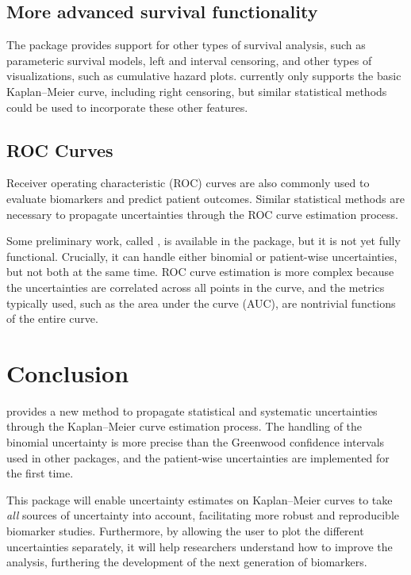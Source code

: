 \documentclass[article]{jss}
\newcommand{\KM}{Kaplan--Meier} %
\begin{document}
\subsection{More advanced survival functionality}

The  package provides support for other types of survival analysis, such as parameteric survival models, left and interval censoring, and other types of visualizations, such as cumulative hazard plots\@.   currently only supports the basic \KM{} curve, including right censoring, but similar statistical methods could be used to incorporate these other features.

\subsection{ROC Curves}

Receiver operating characteristic (ROC) curves are also commonly used to evaluate biomarkers and predict patient outcomes.  Similar statistical methods are necessary to propagate uncertainties through the ROC curve estimation process.

Some preliminary work, called , is available in the  package, but it is not yet fully functional.  Crucially, it can handle either binomial or patient-wise uncertainties, but not both at the same time.  ROC curve estimation is more complex because the uncertainties are correlated across all points in the curve, and the metrics typically used, such as the area under the curve (AUC), are nontrivial functions of the entire curve.

\section{Conclusion}

 provides a new method to propagate statistical and systematic uncertainties through the \KM{} curve estimation process.  The handling of the binomial uncertainty is more precise than the Greenwood confidence intervals used in other packages, and the patient-wise uncertainties are implemented for the first time.

This package will enable uncertainty estimates on \KM{} curves to take \emph{all} sources of uncertainty into account, facilitating more robust and reproducible biomarker studies.  Furthermore, by allowing the user to plot the different uncertainties separately, it will help researchers understand how to improve the analysis, furthering the development of the next generation of biomarkers.
\end{document}
